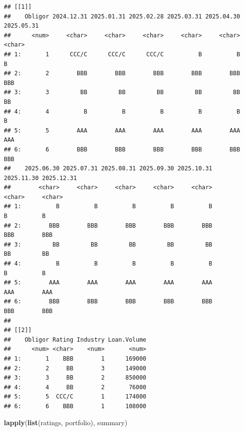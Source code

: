 \documentclass[
  11pt,
]{article}
\newenvironment{Shaded}{\begin{snugshade}}{\end{snugshade}}
\newcommand{\FunctionTok}[1]{\textcolor[rgb]{0.13,0.29,0.53}{\textbf{#1}}}
\newcommand{\NormalTok}[1]{#1}
\begin{document}
\begin{verbatim}
## [[1]]
##    Obligor 2024.12.31 2025.01.31 2025.02.28 2025.03.31 2025.04.30 2025.05.31
##      <num>     <char>     <char>     <char>     <char>     <char>     <char>
## 1:       1      CCC/C      CCC/C      CCC/C          B          B          B
## 2:       2        BBB        BBB        BBB        BBB        BBB        BBB
## 3:       3         BB         BB         BB         BB         BB         BB
## 4:       4          B          B          B          B          B          B
## 5:       5        AAA        AAA        AAA        AAA        AAA        AAA
## 6:       6        BBB        BBB        BBB        BBB        BBB        BBB
##    2025.06.30 2025.07.31 2025.08.31 2025.09.30 2025.10.31 2025.11.30 2025.12.31
##        <char>     <char>     <char>     <char>     <char>     <char>     <char>
## 1:          B          B          B          B          B          B          B
## 2:        BBB        BBB        BBB        BBB        BBB        BBB        BBB
## 3:         BB         BB         BB         BB         BB         BB         BB
## 4:          B          B          B          B          B          B          B
## 5:        AAA        AAA        AAA        AAA        AAA        AAA        AAA
## 6:        BBB        BBB        BBB        BBB        BBB        BBB        BBB
## 
## [[2]]
##    Obligor Rating Industry Loan.Volume
##      <num> <char>    <num>       <num>
## 1:       1    BBB        1      169000
## 2:       2     BB        3      149000
## 3:       3     BB        2      850000
## 4:       4     BB        2       76000
## 5:       5  CCC/C        1      174000
## 6:       6    BBB        1      108000
\end{verbatim}

\begin{Shaded}
\begin{Highlighting}[]
\FunctionTok{lapply}\NormalTok{(}\FunctionTok{list}\NormalTok{(ratings, portfolio), summary)}
\end{Highlighting}
\end{Shaded}
\end{document}
